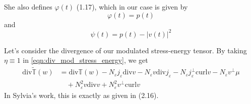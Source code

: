 \documentclass[a4paper]{article}
\newcommand{\curl}{\mathrm{curl}}
\renewcommand{\div}{\mathrm{div}}
\begin{document}
She also defines $\varphi(t)$ (1.17), which in our case is given by
\begin{equation}
  \varphi(t) = p(t)
  \label{eqn:phi}
\end{equation}
and
\begin{equation}
  \psi(t) = p(t) - |v(t)|^2
  \label{eqn:psi}
\end{equation}

Let's consider the divergence of our modulated stress-energy tensor. By taking $\eta \equiv 1$ in \eqref{eqn:div_mod_stress_energy}, we get
\begin{align}
  \div \tilde{\mathbb{T}} (w) &= \div \mathbb{T} (w) - N_\varepsilon j_\varepsilon \div v - N_\varepsilon v \div j_\varepsilon - N_\varepsilon
  j_\varepsilon^\perp \curl v - N_\varepsilon v^\perp \mu \nonumber \\
  &\quad + N_\varepsilon^2 v \div v + N_\varepsilon^2 v^\perp \curl v
  \label{eqn:comparison_div_stress_energy}
\end{align}
In Sylvia's work, this is exactly as given in (2.16).
\end{document}
